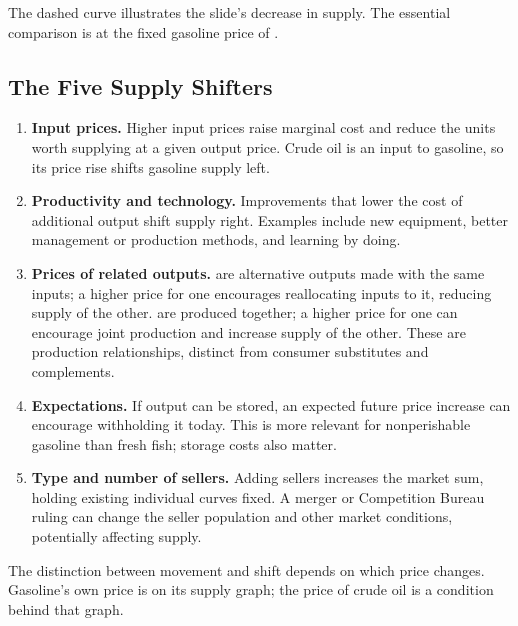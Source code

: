 \begin{center}
\end{center}
The dashed curve illustrates the slide's decrease in supply. The essential
comparison is at the fixed gasoline price of .

\subsection{The Five Supply Shifters}
\begin{enumerate}
\item \textbf{Input prices.} Higher input prices raise marginal cost and
reduce the units worth supplying at a given output price. Crude oil is an
input to gasoline, so its price rise shifts gasoline supply left.
\item \textbf{Productivity and technology.} Improvements that lower the cost
of additional output shift supply right. Examples include new equipment,
better management or production methods, and learning by doing.
\item \textbf{Prices of related outputs.} 
are alternative outputs made with the same inputs; a higher price for one
encourages reallocating inputs to it, reducing supply of the other.
 are produced together; a higher price
for one can encourage joint production and increase supply of the other.
These are production relationships, distinct from consumer substitutes
and complements.
\item \textbf{Expectations.} If output can be stored, an expected future
price increase can encourage withholding it today. This is more relevant
for nonperishable gasoline than fresh fish; storage costs also matter.
\item \textbf{Type and number of sellers.} Adding sellers increases the
market sum, holding existing individual curves fixed. A merger or
Competition Bureau ruling can change the seller population and other
market conditions, potentially affecting supply.
\end{enumerate}
The distinction between movement and shift depends on which price changes.
Gasoline's own price is on its supply graph; the price of crude oil is a
condition behind that graph.

